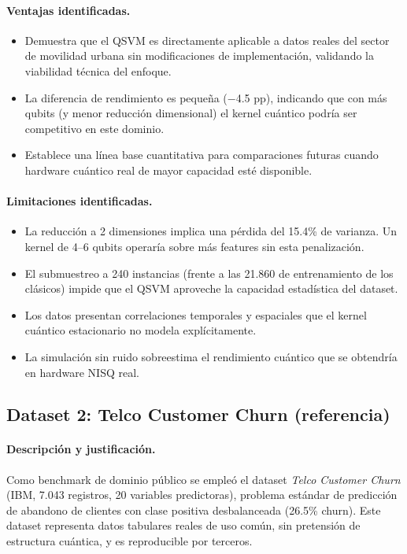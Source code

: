 \paragraph{Ventajas identificadas.}
\begin{itemize}
  \item Demuestra que el QSVM es directamente aplicable a datos reales del sector de movilidad urbana sin modificaciones de implementación, validando la viabilidad técnica del enfoque.
  \item La diferencia de rendimiento es pequeña ($-$4.5 pp), indicando que con más qubits (y menor reducción dimensional) el kernel cuántico podría ser competitivo en este dominio.
  \item Establece una línea base cuantitativa para comparaciones futuras cuando hardware cuántico real de mayor capacidad esté disponible.
\end{itemize}

\paragraph{Limitaciones identificadas.}
\begin{itemize}
  \item La reducción a 2 dimensiones implica una pérdida del 15.4\% de varianza. Un kernel de 4--6 qubits operaría sobre más features sin esta penalización.
  \item El submuestreo a 240 instancias (frente a las 21.860 de entrenamiento de los clásicos) impide que el QSVM aproveche la capacidad estadística del dataset.
  \item Los datos presentan correlaciones temporales y espaciales que el kernel cuántico estacionario no modela explícitamente.
  \item La simulación sin ruido sobreestima el rendimiento cuántico que se obtendría en hardware NISQ real.
\end{itemize}

\subsection{Dataset 2: Telco Customer Churn (referencia)}

\paragraph{Descripción y justificación.}
Como benchmark de dominio público se empleó el dataset \textit{Telco Customer Churn} (IBM, 7.043 registros, 20 variables predictoras), problema estándar de predicción de abandono de clientes con clase positiva desbalanceada (26.5\% churn). Este dataset representa datos tabulares reales de uso común, sin pretensión de estructura cuántica, y es reproducible por terceros.

